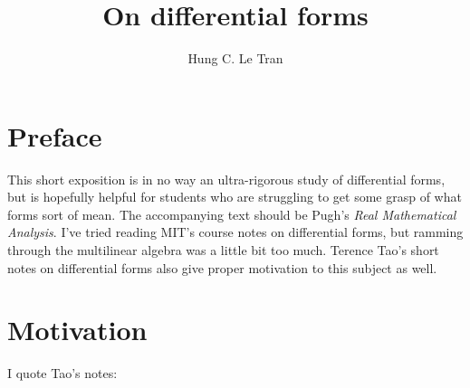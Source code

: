 \documentclass[a4paper, 11pt]{article}
\title{On differential forms}
\author{Hung C. Le Tran}
\begin{document}
\maketitle
\section{Preface}
This short exposition is in no way an ultra-rigorous study of differential forms, but is hopefully helpful for students who are struggling to get some grasp of what forms sort of mean. The accompanying text should be Pugh's \textit{Real Mathematical Analysis}. I've tried reading MIT's course notes on differential forms, but ramming through the multilinear algebra was a little bit too much. Terence Tao's short notes on differential forms also give proper motivation to this subject as well.

\section{Motivation}
I quote Tao's notes:
\end{document}
